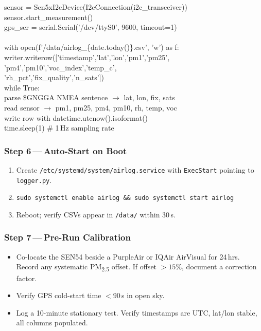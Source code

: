 \documentclass[11pt, letterpaper]{article}
\begin{document}
\begin{tcolorbox}[callout, title={Logger Script---Core Logic (Python pseudocode)}]
\small\ttfamily
sensor = Sen5xI2cDevice(I2cConnection(i2c\_transceiver))\\
sensor.start\_measurement()\\
gps\_ser = serial.Serial('/dev/ttyS0', 9600, timeout=1)\\
\\
with open(f'/data/airlog\_\{date.today()\}.csv', 'w') as f:\\
\quad writer.writerow(['timestamp','lat','lon','pm1','pm25',\\
\quad\quad\quad\quad\quad\quad\quad\quad\quad\quad 'pm4','pm10','voc\_index','temp\_c',\\
\quad\quad\quad\quad\quad\quad\quad\quad\quad\quad 'rh\_pct','fix\_quality','n\_sats'])\\
\quad while True:\\
\quad\quad parse \$GNGGA NMEA sentence $\to$ lat, lon, fix, sats\\
\quad\quad read sensor $\to$ pm1, pm25, pm4, pm10, rh, temp, voc\\
\quad\quad write row with datetime.utcnow().isoformat()\\
\quad\quad time.sleep(1)   \# 1\,Hz sampling rate
\end{tcolorbox}

\subsubsection{Step 6\,---\,Auto-Start on Boot}
\begin{enumerate}
  \item Create \texttt{/etc/systemd/system/airlog.service} with \texttt{ExecStart} pointing to \texttt{logger.py}.
  \item \texttt{sudo systemctl enable airlog \&\& sudo systemctl start airlog}
  \item Reboot; verify CSVs appear in \texttt{/data/} within 30\,s.
\end{enumerate}

\subsubsection{Step 7\,---\,Pre-Run Calibration}
\begin{itemize}
  \item Co-locate the SEN54 beside a PurpleAir or IQAir AirVisual for 24\,hrs. Record any systematic PM\textsubscript{2.5} offset. If offset $> 15\%$, document a correction factor.
  \item Verify GPS cold-start time $< 90$\,s in open sky.
  \item Log a 10-minute stationary test. Verify timestamps are UTC, lat/lon stable, all columns populated.
\end{itemize}
\end{document}
